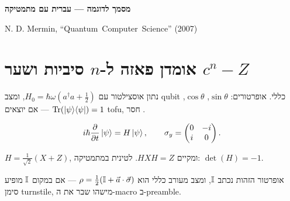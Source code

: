 %

\renewcommand{\thesection}{\arabic{section}}  %



\begin{center}\Large\textbf{מסמך לדוגמה — עברית עם מתמטיקה}\end{center}
\foreignlanguage{english}{N. D. Mermin, \mbox{“Quantum Computer Science”} (2007)}

\section{אומדן פאזה ל-\texorpdfstring{$n$}{n} סיביות ושער
  \texorpdfstring{$c^n-Z$}{c\textasciicircum n-Z}}

\noindent
נתון אוסצילטור עם $H_0 = \hbar\omega(a^\dagger a + \tfrac12)$, ומצב qubit כללי.
אופרטורים: $\sin\theta$, $\cos\theta$, $\operatorname{Tr}(\left|\psi\right\rangle\!\left\langle\psi\right|)=1$ — אם יוצאים tofu, חסר \code{[no-math]}.

\[ i\hbar\frac{\partial}{\partial t}\left|\psi\right\rangle = H\left|\psi\right\rangle,\qquad
   \sigma_y = \begin{pmatrix} 0 & -i \\ i & 0 \end{pmatrix}. \]

\begin{defbox}[frametitle={הגדרה — שער הדמרד}]
$H=\tfrac1{\sqrt2}(X+Z)$, ומקיים $HXH=Z$. לטינית במתמטיקה: $\det(H)=-1$.
\end{defbox}

\noindent אופרטור הזהות נכתב $\mathbb{I}$, ומצב מעורב כללי הוא
$\rho=\tfrac12(\mathbb{I}+\vec a\cdot\vec\sigma)$ — אם במקום $\mathbb{I}$ מופיע סימן turnstile, מישהו
שבר את ה-macro  ב-preamble.

